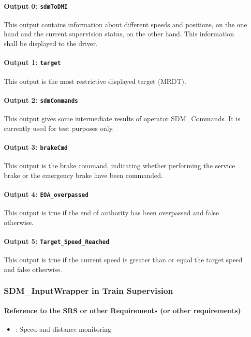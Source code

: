 \paragraph{Output 0: \texttt{sdmToDMI}}
This output contains information about different speeds and positions, on the one hand and the current supervision status, on the other hand. This information shall be displayed to the driver.
\paragraph{Output 1: \texttt{target}}
This output is the most restrictive displayed target (MRDT).
\paragraph{Output 2: \texttt{sdmCommands}}
This output gives some intermediate results of operator SDM\_Commands. It is currently used for test purposes only.
\paragraph{Output 3: \texttt{brakeCmd}}
This output is the brake command, indicating whether performing the service brake or the emergency brake have been commanded.
\paragraph{Output 4: \texttt{EOA\_overpassed}}
This output is true if the end of authority has been overpassed and false otherwise.
\paragraph{Output 5: \texttt{Target\_Speed\_Reached}}
This output is true if the current speed is greater than or equal the target speed and false otherwise.



\subsubsection{SDM\_InputWrapper in Train Supervision}

\paragraph{Reference to the SRS or other Requirements (or other requirements)}
\begin{itemize}
	\item \cite[Chapt.~3.13]{subset-026}: Speed and distance monitoring 
\end{itemize}

